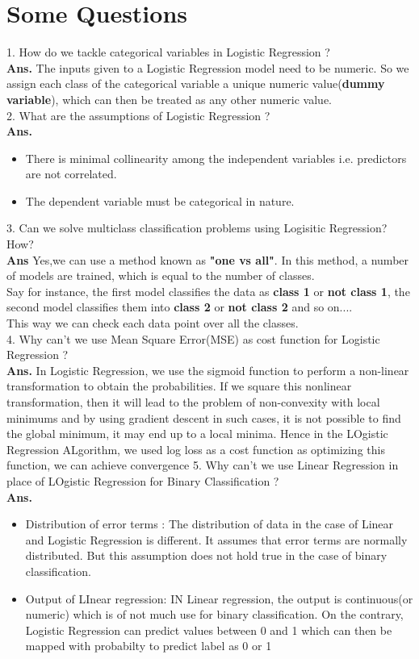 \documentclass[a4paper, 11pt]{article}
\begin{document}
\section{Some Questions}
1. How do we tackle categorical variables in Logistic Regression ?\\
\textbf{Ans.}  The inputs given to a Logistic Regression model need to be numeric.
So we assign each class of the categorical variable a unique numeric value(\textbf{dummy variable}), which can then be treated as any other numeric value.\\
2. What are the assumptions of Logistic Regression ? \\
\textbf{Ans.}
\begin{itemize}
\item There is minimal collinearity among the independent variables i.e. predictors are not correlated.
 \item The dependent variable must be categorical in nature.
\end{itemize}
3. Can we solve multiclass classification problems using Logisitic Regression? How? \\ 
\textbf{Ans} Yes,we can use a method known as \textbf{"one vs all"}. In this method, a number of models are trained, which is equal to the number of classes.\\
Say for instance, the first model classifies the data as \textbf{class 1} or \textbf{not class 1}, the second model classifies them into  \textbf{class 2} or \textbf{not class 2} and so on....\\
This way we can check each data point over all the classes.\\
4. Why can't we use Mean Square Error(MSE) as cost function for Logistic Regression ? \\
\textbf{Ans.} In Logistic Regression, we use the sigmoid function to perform a non-linear transformation
 to obtain the probabilities. If we square this nonlinear transformation, then it will lead to the problem of 
 non-convexity with local minimums and by using gradient descent in such cases, it is not possible to find the global minimum,
  it may end up to a local minima. Hence in the LOgistic Regression ALgorithm, we used log loss as a cost function as optimizing this function, we can achieve convergence
5. Why can't we use Linear Regression in place of LOgistic Regression for Binary Classification ?
\\ \textbf{Ans. } \begin{itemize}
    \item Distribution of error terms : The distribution of data in the case of Linear and Logistic Regression is different. It assumes that error terms are normally distributed. But this assumption does not hold true in the case of binary classification.
    \item Output of LInear regression: IN Linear regression, the output is continuous(or numeric) which is of not much use for binary classification. On the contrary, Logistic Regression can predict values between 0 and 1 which can then be mapped with probabilty to predict label as 0 or 1
\end{itemize}


\end{document}
